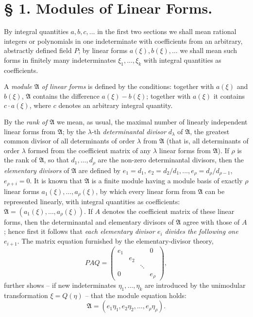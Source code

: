 \documentclass[11pt]{article}
\newcommand{\Amod}{\mathfrak A}
\begin{document}
\section*{§ 1. Modules of Linear Forms.}

By integral quantities $a,b,c,\ldots$ in the first two sections we shall mean rational integers or polynomials in one indeterminate with coefficients from an arbitrary, abstractly defined field $P$; by linear forms $a(\xi),b(\xi),\ldots$ we shall mean such forms in finitely many indeterminates $\xi_1,\ldots,\xi_k$ with integral quantities as coefficients.

A \emph{module $\Amod$ of linear forms} is defined by the conditions: together with $a(\xi)$ and $b(\xi)$, $\Amod$ contains the difference $a(\xi)-b(\xi)$; together with $a(\xi)$ it contains $c\cdot a(\xi)$, where $c$ denotes an arbitrary integral quantity.

By the \emph{rank of $\Amod$} we mean, as usual, the maximal number of linearly independent linear forms from $\Amod$; by the $\lambda$-th \emph{determinantal divisor} $d_\lambda$ of $\Amod$, the greatest common divisor of all determinants of order $\lambda$ from $\Amod$ (that is, all determinants of order $\lambda$ formed from the coefficient matrix of any $\lambda$ linear forms from $\Amod$). If $\rho$ is the rank of $\Amod$, so that $d_1,\ldots,d_\rho$ are the non-zero determinantal divisors, then the \emph{elementary divisors} of $\Amod$ are defined by $e_1=d_1$, $e_2=d_2/d_1,\ldots,e_\rho=d_\rho/d_{\rho-1}$, $e_{\rho+i}=0$. It is known that $\Amod$ is a finite module having a module basis of exactly $\rho$ linear forms $a_1(\xi),\ldots,a_\rho(\xi)$, by which every linear form from $\Amod$ can be represented linearly, with integral quantities as coefficients: $\Amod=(a_1(\xi),\ldots,a_\rho(\xi))$. If $A$ denotes the coefficient matrix of these linear forms, then the determinantal and elementary divisors of $\Amod$ agree with those of $A$; hence first it follows that \emph{each elementary divisor $e_i$ divides the following one $e_{i+1}$}. The matrix equation furnished by the elementary-divisor theory,
\[
 P A Q=\begin{pmatrix}
 e_1&&&0\\
 &e_2&&\\
 &&\ddots&\\
 0&&&e_\rho
 \end{pmatrix},
\]
further shows -- if new indeterminates $\eta_1,\ldots,\eta_k$ are introduced by the unimodular transformation $\xi=Q(\eta)$ -- that the module equation holds:
\begin{equation}
 \Amod=(e_1\eta_1,e_2\eta_2,\ldots,e_\rho\eta_\rho).
\tag{1}
\end{equation}
\end{document}
